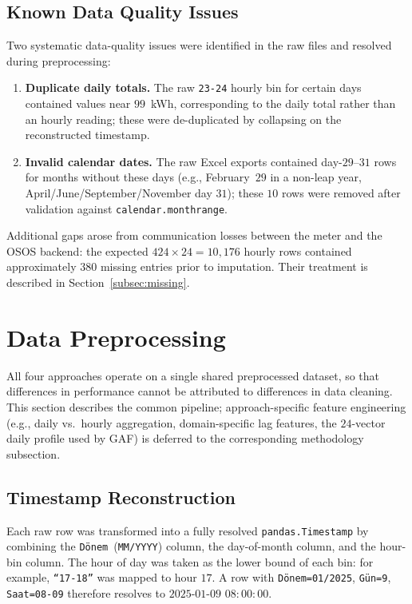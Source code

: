 \documentclass[11pt]{article}
\begin{document}
\subsection{Known Data Quality Issues}
\label{subsec:quality}
Two systematic data-quality issues were identified in the raw files and resolved during preprocessing:

\begin{enumerate}[leftmargin=1.5em,itemsep=2pt]
  \item \textbf{Duplicate daily totals.} The raw \texttt{23-24} hourly bin for certain days contained values near $99$~kWh, corresponding to the daily total rather than an hourly reading; these were de-duplicated by collapsing on the reconstructed timestamp.
  \item \textbf{Invalid calendar dates.} The raw Excel exports contained day-$29$--$31$ rows for months without these days (e.g., February~$29$ in a non-leap year, April/June/September/November day $31$); these $10$ rows were removed after validation against \texttt{calendar.monthrange}.
\end{enumerate}

Additional gaps arose from communication losses between the meter and the OSOS backend: the expected $424 \times 24 = 10{,}176$ hourly rows contained approximately $380$ missing entries prior to imputation. Their treatment is described in Section~\ref{subsec:missing}.

\section{Data Preprocessing}\label{sec:preprocessing}
All four approaches operate on a single shared preprocessed dataset, so that differences in performance cannot be attributed to differences in data cleaning. This section describes the common pipeline; approach-specific feature engineering (e.g., daily vs.\ hourly aggregation, domain-specific lag features, the $24$-vector daily profile used by GAF) is deferred to the corresponding methodology subsection.

\subsection{Timestamp Reconstruction}
Each raw row was transformed into a fully resolved \texttt{pandas.Timestamp} by combining the \texttt{D\"onem}~(\texttt{MM/YYYY}) column, the day-of-month column, and the hour-bin column. The hour of day was taken as the lower bound of each bin: for example, \texttt{``17-18''} was mapped to hour $17$. A row with \texttt{D\"onem=01/2025}, \texttt{G\"un=9}, \texttt{Saat=08-09} therefore resolves to $2025\text{-}01\text{-}09$ $08{:}00{:}00$.
\end{document}
